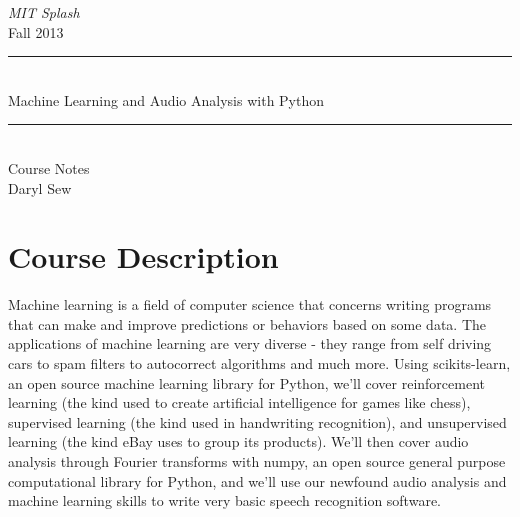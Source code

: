 \documentclass[11pt]{article}
\begin{document}
\begin{titlepage}
\begin{center}
\textsl{\huge MIT Splash}\\[0.5cm]
{\huge Fall 2013}\\[0.2cm]
\rule{\linewidth}{0.5mm}\\[0.2cm]
{\Huge Machine Learning and Audio Analysis with Python}
\rule{\linewidth}{0.5mm}\\[0.4cm]
\huge Course Notes\\[0.2cm]
\large Daryl Sew
\end{center}
\end{titlepage}

\pagestyle{fancy}
\fancyhf{}
\setlength{\headheight}{30pt}
\renewcommand{\headrulewidth}{0.4pt}
\renewcommand{\footrulewidth}{0.4pt}
\cfoot{\thepage}

\tableofcontents
\pagebreak

\section{Course Description}
Machine learning is a field of computer science that concerns writing programs that can make and improve predictions or behaviors based on some data. The applications of machine learning are very diverse - they range from self driving cars to spam filters to autocorrect algorithms and much more. Using scikits-learn, an open source machine learning library for Python, we'll cover reinforcement learning (the kind used to create artificial intelligence for games like chess), supervised learning (the kind used in handwriting recognition), and unsupervised learning (the kind eBay uses to group its products). We'll then cover audio analysis through Fourier transforms with numpy, an open source general purpose computational library for Python, and we'll use our newfound audio analysis and machine learning skills to write very basic speech recognition software.
\end{document}
